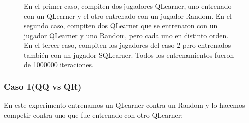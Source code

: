 \documentclass[10pt, a4paper]{article}
\begin{document}
\begin{figure}[H]
\begin{minipage}[c]{1\textwidth}
  \caption{En el primer caso, compiten dos jugadores QLearner, uno entrenado con un QLearner y el otro entrenado con un jugador Random.
  En el segundo caso, compiten dos QLearner que se entrenaron con un jugador QLearner y uno Random, pero cada uno en distinto orden.
  En el tercer caso, compiten los jugadores del caso 2 pero entrenados también con un jugador SQLearner.  Todos los entrenamientos fueron de 1000000 iteraciones. }
  \end{minipage}
\end{figure}


\subsubsection{Caso 1(QQ vs QR)}


En este experimento entrenamos un QLearner contra un Random y lo hacemos competir contra uno que fue entrenado con otro QLearner:
\end{document}

